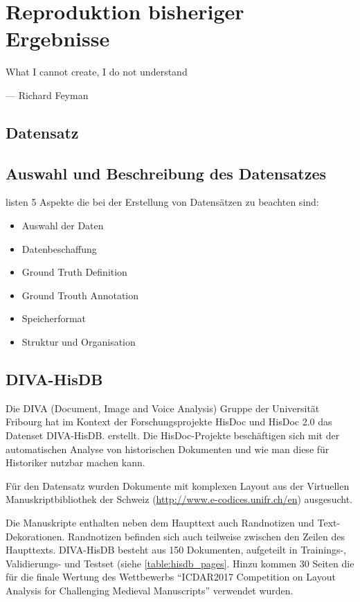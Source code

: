 \chapter{Reproduktion bisheriger Ergebnisse}
\label{chap:reproduktion}
\epigraph{What I cannot create, I do not understand}{--- Richard Feyman}

\section{Datensatz}

\section{Auswahl und Beschreibung des Datensatzes}
\textcite[985\psqq]{DoermannHandbookdocumentimage2014} listen 5 Aspekte die bei der Erstellung von Datensätzen zu beachten sind:
\begin{itemize}
    \item Auswahl der Daten
    \item Datenbeschaffung
    \item Ground Truth Definition
    \item Ground Trouth Annotation
    \item Speicherformat
    \item Struktur und Organisation
\end{itemize}

\section{DIVA-HisDB}
Die DIVA  (Document, Image and Voice Analysis) Gruppe der Universität Fribourg hat im Kontext der Forschungsprojekte HisDoc und HisDoc 2.0 
das Datenset DIVA-HisDB. erstellt.
Die HisDoc-Projekte beschäftigen sich mit der automatischen Analyse von historischen Dokumenten und
wie man diese für Historiker nutzbar machen kann.

\cite{SimistiraDIVAHisDBPreciselyAnnotated2016}

Für den Datensatz wurden Dokumente mit komplexen Layout aus der Virtuellen Manuskriptbibliothek der Schweiz (\url{http://www.e-codices.unifr.ch/en}) ausgesucht. 

Die Manuskripte enthalten neben dem Haupttext auch Randnotizen und Text-Dekorationen. 
Randnotizen befinden sich auch teilweise zwischen den Zeilen des Haupttexts.
DIVA-HisDB besteht aus 150 Dokumenten, aufgeteilt in Trainings-, Validierungs- und Testset (siehe \cref{table:hisdb_pages}. 
Hinzu kommen 30 Seiten die für die finale Wertung des Wettbewerbs ``ICDAR2017 Competition on Layout Analysis for Challenging Medieval Manuscripts'' verwendet wurden.

